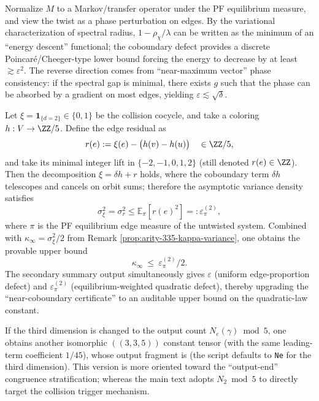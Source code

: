 \begin{remark}\label{rem:coboundary-defect-proof}
Normalize $M$ to a Markov/transfer operator under the PF equilibrium measure, and view the twist as a phase perturbation on edges. By the variational characterization of spectral radius, $1-\rho_\chi/\lambda$ can be written as the minimum of an ``energy descent'' functional; the coboundary defect provides a discrete Poincar\'e/Cheeger-type lower bound forcing the energy to decrease by at least \(\gtrsim \varepsilon^2\). The reverse direction comes from ``near-maximum vector'' phase consistency: if the spectral gap is minimal, there exists $g$ such that the phase can be absorbed by a gradient on most edges, yielding \(\varepsilon\lesssim \sqrt{\delta}\).
\end{remark}

\begin{remark}[Provable upper bound from ``best coloring'': \texorpdfstring{$\kappa_\infty\le \varepsilon_\pi^{(2)}/2$}{kappa <= eps/2}]\label{rem:arity-335-eps-bound}
Let \(\xi=\mathbf{1}_{\{d=2\}}\in\{0,1\}\) be the collision cocycle, and take a coloring \(h:V\to\ZZ/5\).
Define the edge residual as
$$
r(e):=\xi(e)-\bigl(h(v)-h(u)\bigr)\quad\in\ZZ/5,
$$
and take its minimal integer lift in \(\{-2,-1,0,1,2\}\) (still denoted \(r(e)\in\ZZ\)).
Then the decomposition \(\xi=\delta h+r\) holds, where the coboundary term \(\delta h\) telescopes and cancels on orbit sums; therefore the asymptotic variance density satisfies
$$
\sigma_\xi^2=\sigma_r^2\le \mathbb{E}_\pi[r(e)^2]=:\varepsilon_\pi^{(2)},
$$
where \(\pi\) is the PF equilibrium edge measure of the untwisted system.
Combined with \(\kappa_\infty=\sigma_\xi^2/2\) from Remark \ref{prop:arity-335-kappa-variance}, one obtains the provable upper bound
$$
\kappa_\infty\ \le\ \varepsilon_\pi^{(2)}/2.
$$
The secondary summary output simultaneously gives \(\varepsilon\) (uniform edge-proportion defect) and \(\varepsilon_\pi^{(2)}\) (equilibrium-weighted quadratic defect), thereby upgrading the ``near-coboundary certificate'' to an auditable upper bound on the quadratic-law constant.
\end{remark}

\begin{remark}\label{rem:arity-335-ne-mod5}
If the third dimension is changed to the output count $N_e(\gamma)\bmod 5$, one obtains another isomorphic $((3,3,5))$ constant tensor (with the same leading-term coefficient $1/45$), whose output fragment is
\verb||
(the script defaults to \texttt{Ne} for the third dimension). This version is more oriented toward the ``output-end'' congruence stratification; whereas the main text adopts $N_2\bmod 5$ to directly target the collision trigger mechanism.
\end{remark}

